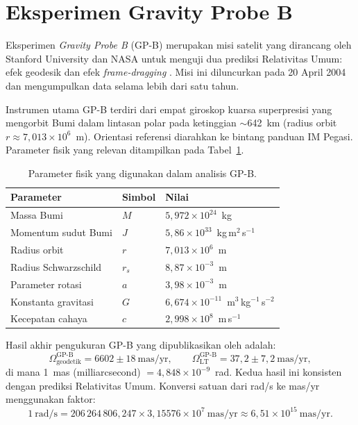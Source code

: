 \section{Eksperimen Gravity Probe B}
\label{sec:gravity-probe-b}

Eksperimen \textit{Gravity Probe B} (GP-B) merupakan misi satelit yang dirancang oleh Stanford University dan NASA untuk menguji dua prediksi Relativitas Umum: efek geodesik dan efek \textit{frame-dragging} \parencite{Turneaure1986GravityProbeBApproach}. Misi ini diluncurkan pada 20 April 2004 dan mengumpulkan data selama lebih dari satu tahun.

Instrumen utama GP-B terdiri dari empat giroskop kuarsa superpresisi yang mengorbit Bumi dalam lintasan polar pada ketinggian $\sim$642~km (radius orbit $r \approx 7{,}013 \times 10^6$~m). Orientasi referensi diarahkan ke bintang panduan IM Pegasi. Parameter fisik yang relevan ditampilkan pada Tabel~\ref{tab:param-gpb}.

\begin{table}[ht]
\centering
\caption{Parameter fisik yang digunakan dalam analisis GP-B.}
\label{tab:param-gpb}
\begin{tabular}{lll}
\toprule
\textbf{Parameter} & \textbf{Simbol} & \textbf{Nilai} \\
\midrule
Massa Bumi             & $M$    & $5{,}972 \times 10^{24}$~kg \\
Momentum sudut Bumi    & $J$    & $5{,}86 \times 10^{33}$~kg\,m$^2$\,s$^{-1}$ \\
Radius orbit           & $r$    & $7{,}013 \times 10^{6}$~m \\
Radius Schwarzschild   & $r_s$  & $8{,}87 \times 10^{-3}$~m \\
Parameter rotasi       & $a$    & $3{,}98 \times 10^{-3}$~m \\
Konstanta gravitasi    & $G$    & $6{,}674 \times 10^{-11}$~m$^3$\,kg$^{-1}$\,s$^{-2}$ \\
Kecepatan cahaya       & $c$    & $2{,}998 \times 10^{8}$~m\,s$^{-1}$ \\
\bottomrule
\end{tabular}
\end{table}

Hasil akhir pengukuran GP-B yang dipublikasikan oleh \textcite{Everitt2011GravityProbeB} adalah:
\begin{equation}
    \Omega_{\text{geodetik}}^{\text{GP-B}} = 6602 \pm 18~\text{mas/yr}, \qquad
    \Omega_{\text{LT}}^{\text{GP-B}} = 37{,}2 \pm 7{,}2~\text{mas/yr},
    \label{eq:gpb-results}
\end{equation}
di mana 1~mas (milliarcsecond) $= 4{,}848 \times 10^{-9}$~rad. Kedua hasil ini konsisten dengan prediksi Relativitas Umum. Konversi satuan dari rad/s ke mas/yr menggunakan faktor:
\begin{equation}
    1~\text{rad/s} = 206\,264\,806{,}247 \times 3{,}15576 \times 10^7~\text{mas/yr}
    \approx 6{,}51 \times 10^{15}~\text{mas/yr}.
    \label{eq:konversi-masyr}
\end{equation}

